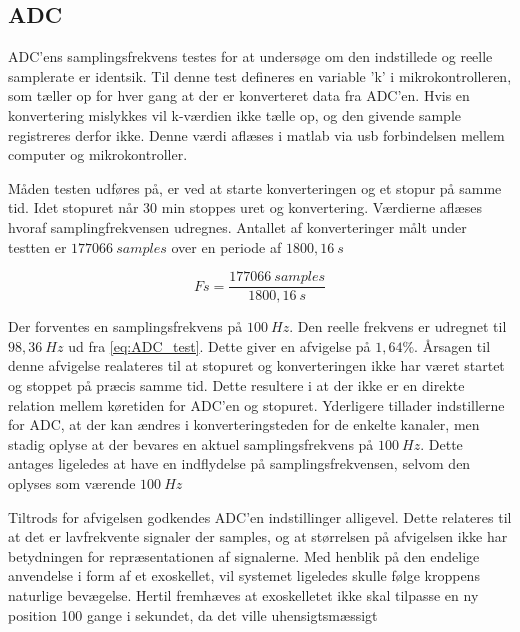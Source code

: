 \subsection{ADC}
ADC'ens samplingsfrekvens testes for at undersøge om den indstillede og reelle samplerate er identsik. Til denne test defineres en variable 'k' i mikrokontrolleren, som tæller op for hver gang at der er konverteret data fra ADC'en. Hvis en konvertering mislykkes vil k-værdien ikke tælle op, og den givende sample registreres derfor ikke. Denne værdi aflæses i matlab via usb forbindelsen mellem computer og mikrokontroller. 

Måden testen udføres på, er ved at starte konverteringen og et stopur på samme tid. Idet stopuret når 30 min stoppes uret og konvertering. Værdierne aflæses hvoraf samplingfrekvensen udregnes. Antallet af konverteringer målt under testten er $177066~samples$ over en periode af $1800,16~s$

\begin{equation}\label{eq:ADC_test}
Fs = \frac{177066~samples}{1800,16~s}
\end{equation}

\noindent
Der forventes en samplingsfrekvens på $100~Hz$. Den reelle frekvens er udregnet til $98,36~Hz$ ud fra \autoref{eq:ADC_test}. Dette giver en afvigelse på $1,64\%$. Årsagen til denne afvigelse realateres til at stopuret og konverteringen ikke har været startet og stoppet på præcis samme tid. Dette resultere i at der ikke er en direkte relation mellem køretiden for ADC'en og stopuret. Yderligere tillader indstillerne for ADC, at der kan ændres i konverteringsteden for de enkelte kanaler, men stadig oplyse at der bevares en aktuel samplingsfrekvens på $100~Hz$. Dette antages ligeledes at have en indflydelse på samplingsfrekvensen, selvom den oplyses som værende $100~Hz$ 

Tiltrods for afvigelsen godkendes ADC'en indstillinger alligevel. Dette relateres til at det er lavfrekvente signaler der samples, og at størrelsen på afvigelsen ikke har betydningen for repræsentationen af signalerne. 
Med henblik på den endelige anvendelse i form af et exoskellet, vil systemet ligeledes skulle følge kroppens naturlige bevægelse. Hertil fremhæves at exoskelletet ikke skal tilpasse en ny position 100 gange i sekundet, da det ville uhensigtsmæssigt

